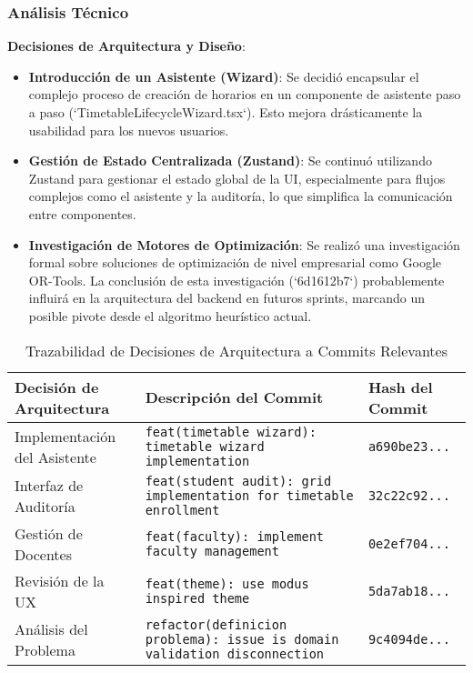 \subsubsection{Análisis Técnico}

\textbf{Decisiones de Arquitectura y Diseño}:
\begin{itemize}
    \item \textbf{Introducción de un Asistente (Wizard)}: Se decidió encapsular el complejo proceso de creación de horarios en un componente de asistente paso a paso (`TimetableLifecycleWizard.tsx`). Esto mejora drásticamente la usabilidad para los nuevos usuarios.
    \item \textbf{Gestión de Estado Centralizada (Zustand)}: Se continuó utilizando Zustand para gestionar el estado global de la UI, especialmente para flujos complejos como el asistente y la auditoría, lo que simplifica la comunicación entre componentes.
    \item \textbf{Investigación de Motores de Optimización}: Se realizó una investigación formal sobre soluciones de optimización de nivel empresarial como Google OR-Tools. La conclusión de esta investigación (`6d1612b7`) probablemente influirá en la arquitectura del backend en futuros sprints, marcando un posible pivote desde el algoritmo heurístico actual.
\end{itemize}

\begin{table}[H]
    \caption{Trazabilidad de Decisiones de Arquitectura a Commits Relevantes}
    \label{tab:sprint-9-commit-traceability}
    \begin{tabularx}{\textwidth}{@{}lXl@{}}
        \toprule
        \textbf{Decisión de Arquitectura} & \textbf{Descripción del Commit} & \textbf{Hash del Commit} \\
        \midrule
        Implementación del Asistente & \texttt{feat(timetable wizard): timetable wizard implementation} & \texttt{a690be23...} \\
        Interfaz de Auditoría & \texttt{feat(student audit): grid implementation for timetable enrollment} & \texttt{32c22c92...} \\
        Gestión de Docentes & \texttt{feat(faculty): implement faculty management} & \texttt{0e2ef704...} \\
        Revisión de la UX & \texttt{feat(theme): use modus inspired theme} & \texttt{5da7ab18...} \\
        Análisis del Problema & \texttt{refactor(definicion problema): issue is domain validation disconnection} & \texttt{9c4094de...} \\
        \bottomrule
    \end{tabularx}
\end{table}

